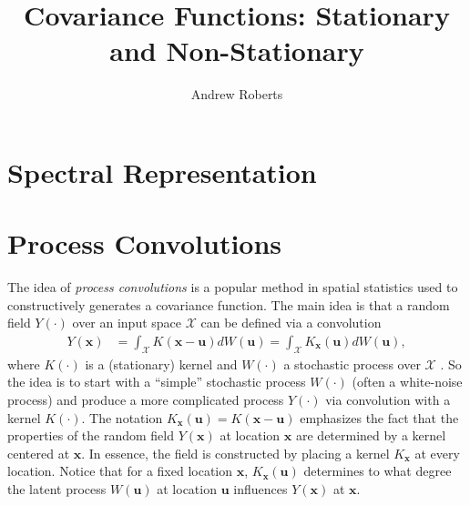 \documentclass[12pt]{article}
\title{Covariance Functions: Stationary and Non-Stationary}
\author{Andrew Roberts}
\newcommand{\Ker}{K}
\newcommand{\locSpace}{\mathcal{X}}
\newcommand{\loc}{\mathbf{x}}
\newcommand{\locDum}{\mathbf{u}}
\newcommand{\rf}{Y}
\begin{document}
\maketitle
\tableofcontents
\newpage

\section{Spectral Representation}

\section{Process Convolutions}
The idea of \textit{process convolutions} is a popular method in spatial statistics used to constructively generates a covariance function. The main idea is that a random field $\rf(\cdot)$ over an input space 
$\locSpace$ can be defined via a convolution 
\begin{align}
\rf(\loc) &= \int_{\locSpace} \Ker(\loc - \locDum) dW(\locDum) =  \int_{\locSpace} \Ker_{\loc}(\locDum) dW(\locDum), \label{process_convolution}
\end{align}
where $\Ker(\cdot)$ is a (stationary) kernel and $W(\cdot)$ a stochastic process over $\locSpace$ \cite{Risser}. So the idea is to start with a ``simple'' stochastic process $W(\cdot)$ (often a white-noise process) and produce a 
more complicated process $\rf(\cdot)$ via convolution with a kernel $\Ker(\cdot)$. The notation $\Ker_{\loc}(\locDum) = \Ker(\loc - \locDum)$ emphasizes the fact that the properties of the random field $\rf(\loc)$ at location 
$\loc$ are determined by a kernel centered at $\loc$. In essence, the field is constructed by placing a kernel $\Ker_{\loc}$ at every location. Notice that for a fixed location $\loc$, $\Ker_{\loc}(\locDum)$ determines to what degree
the latent process $W(\locDum)$ at location $\locDum$ influences $\rf(\loc)$ at $\loc$. 
\end{document}
